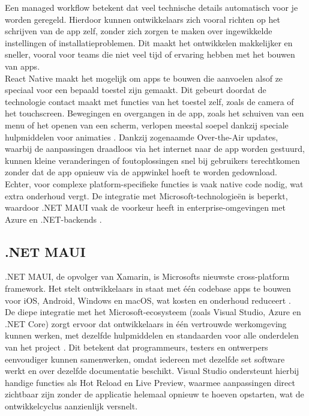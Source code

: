 Een managed workflow betekent dat veel technische details automatisch voor je worden geregeld. Hierdoor kunnen ontwikkelaars zich vooral richten op het schrijven van de app zelf, zonder zich zorgen te maken over ingewikkelde instellingen of installatieproblemen. Dit maakt het ontwikkelen makkelijker en sneller, vooral voor teams die niet veel tijd of ervaring hebben met het bouwen van apps.\\

React Native maakt het mogelijk om apps te bouwen die aanvoelen alsof ze speciaal voor een bepaald toestel zijn gemaakt. Dit gebeurt doordat de technologie contact maakt met functies van het toestel zelf, zoals de camera of het touchscreen. Bewegingen en overgangen in de app, zoals het schuiven van een menu of het openen van een scherm, verlopen meestal soepel dankzij speciale hulpmiddelen voor animaties \autocite{Danielsson2016}. Dankzij zogenaamde Over-the-Air updates, waarbij de aanpassingen draadloos via het internet naar de app worden gestuurd, kunnen kleine veranderingen of foutoplossingen snel bij gebruikers terechtkomen zonder dat de app opnieuw via de appwinkel hoeft te worden gedownload.\\

Echter, voor complexe platform-specifieke functies is vaak native code nodig, wat extra onderhoud vergt. De integratie met Microsoft-technologieën is beperkt, waardoor .NET MAUI vaak de voorkeur heeft in enterprise-omgevingen met Azure en .NET-backends \autocite{Longe2025}.

\subsection{.NET MAUI}
.NET MAUI, de opvolger van Xamarin, is Microsofts nieuwste cross-platform framework. Het stelt ontwikkelaars in staat met één codebase apps te bouwen voor iOS, Android, Windows en macOS, wat kosten en onderhoud reduceert \autocite{Omsha2024}.\\

De diepe integratie met het Microsoft-ecosysteem (zoals Visual Studio, Azure en .NET Core) zorgt ervoor dat ontwikkelaars in één vertrouwde werkomgeving kunnen werken, met dezelfde hulpmiddelen en standaarden voor alle onderdelen van het project \autocite{Omsha2024}. Dit betekent dat programmeurs, testers en ontwerpers eenvoudiger kunnen samenwerken, omdat iedereen met dezelfde set software werkt en over dezelfde documentatie beschikt. Visual Studio ondersteunt hierbij handige functies als Hot Reload en Live Preview, waarmee aanpassingen direct zichtbaar zijn zonder de applicatie helemaal opnieuw te hoeven opstarten, wat de ontwikkelcyclus aanzienlijk versnelt.\\

